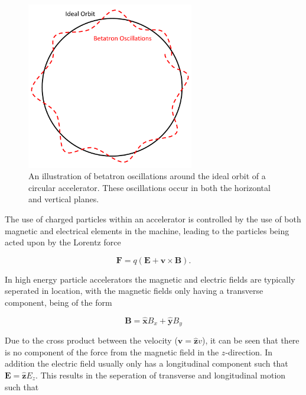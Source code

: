 \begin{figure}
\begin{center}
\includegraphics[width=0.65\textwidth]{Introduction/figures/betatron-motion.pdf}
\end{center}
\caption{An illustration of betatron oscillations around the ideal orbit of a circular accelerator. These oscillations occur in both the horizontal and vertical planes.}
\label{fig:betatron-motion}
\end{figure}

The use of charged particles within an accelerator is controlled by the use of both magnetic and electrical elements in the machine, leading to the particles being acted upon by the Lorentz force

\begin{equation}
\mathbf{F} = q \left( \mathbf{E} + \mathbf{v} \times \mathbf{B} \right).
\end{equation}

In high energy particle accelerators the magnetic and electric fields are typically seperated in location, with the magnetic fields only having a transverse component, being of the form

\begin{equation}
\mathbf{B} = \mathbf{\hat{x}} B_{x} + \mathbf{\hat{y}} B_{y}
\end{equation}

Due to the cross product between the velocity ($\mathbf{v} = \mathbf{\hat{z}} v$), it can be seen that there is no component of the force from the magnetic field in the $z$-direction. In addition the electric field usually only has a longitudinal component such that $\mathbf{E} = \mathbf{\hat{z}} E_{z}$. This results in the seperation of transverse and longitudinal motion such that


